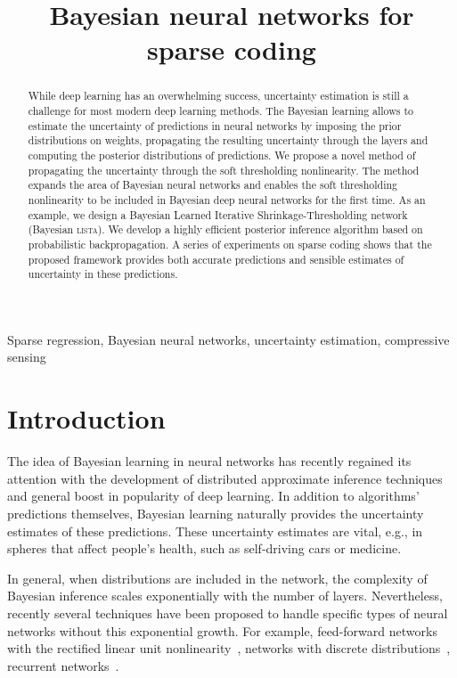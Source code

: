 \documentclass{article}
\title{Bayesian neural networks for sparse coding}
\begin{document}
\maketitle

\begin{abstract}
  While deep learning has an overwhelming success, uncertainty estimation is still a challenge for most modern deep learning methods. The Bayesian learning allows to estimate the uncertainty of predictions in neural networks by imposing the prior distributions on weights, propagating the resulting uncertainty through the layers and computing the posterior distributions of predictions. We propose a novel method of propagating the uncertainty through the soft thresholding nonlinearity. The method expands the area of Bayesian neural networks and enables the soft thresholding nonlinearity to be included in Bayesian deep neural networks for the first time. As an example, we design a Bayesian Learned Iterative Shrinkage-Thresholding network (Bayesian \textsc{lista}). We develop a highly efficient posterior inference algorithm based on probabilistic backpropagation. A series of experiments on sparse coding shows that the proposed framework provides both accurate predictions and sensible estimates of uncertainty in these predictions.
\end{abstract}

\begin{keywords}
Sparse regression, Bayesian neural networks, uncertainty estimation, compressive sensing
\end{keywords}

\section{Introduction}
\label{sec:intro}

  The idea of Bayesian learning in neural networks \cite{neal2012bayesian} has recently regained its attention with the development of distributed approximate inference techniques \cite{li2015stochastic, hoffman2013stochastic} and general boost in popularity of deep learning. In addition to algorithms' predictions themselves, Bayesian learning naturally provides the uncertainty estimates of these predictions. These uncertainty estimates are vital, e.g., in spheres that affect people's health, such as self-driving cars or medicine.

  In general, when distributions are included in the network, the complexity of Bayesian inference scales exponentially with the number of layers. Nevertheless, recently several techniques have been proposed to handle specific types of neural networks without this exponential growth. For example, feed-forward networks with the rectified linear unit nonlinearity~\cite{hernandez2015probabilistic}, networks with discrete distributions~\cite{soudry2014expectation}, recurrent networks~\cite{mcdermott2017bayesian}.
\end{document}
